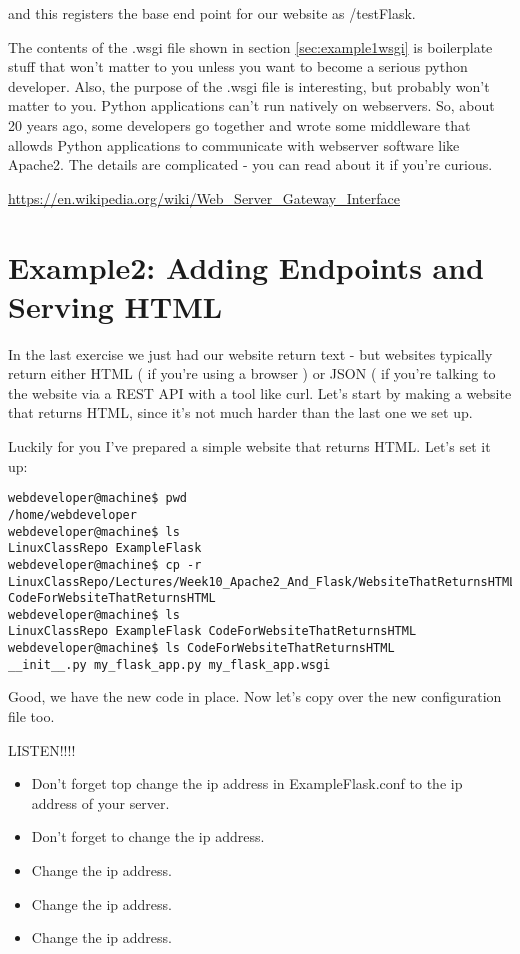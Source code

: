 \documentclass[10pt]{article}
\begin{document}
and this registers the base end point for our website as /testFlask.

The contents of the .wsgi file shown in section \ref{sec:example1wsgi} is boilerplate stuff that won't matter to you unless you want to become a serious python developer. Also, the purpose of the .wsgi file is interesting, but probably won't matter to you. Python applications can't run natively on webservers. So, about 20 years ago, some developers go together and wrote some middleware that allowds Python applications to communicate with webserver software like Apache2. The details are complicated - you can read about it if you're curious. 

\url{https://en.wikipedia.org/wiki/Web_Server_Gateway_Interface}


\section{Example2: Adding Endpoints and Serving HTML}
In the last exercise we just had our website return text - but websites
typically return either HTML ( if you're using a browser ) or JSON ( if you're
talking to the website via a REST API with a tool like curl. Let's start by
making a website that returns HTML, since it's not much harder than the last one
we set up.

Luckily for you I've prepared a simple website that returns HTML. Let's set it
up:

\begin{lstlisting}[style=term, caption=Deploying our second website]
webdeveloper@machine$ pwd
/home/webdeveloper
webdeveloper@machine$ ls
LinuxClassRepo ExampleFlask
webdeveloper@machine$ cp -r
LinuxClassRepo/Lectures/Week10_Apache2_And_Flask/WebsiteThatReturnsHTML/CodeForWebsiteThatReturnsHTML
CodeForWebsiteThatReturnsHTML
webdeveloper@machine$ ls
LinuxClassRepo ExampleFlask CodeForWebsiteThatReturnsHTML
webdeveloper@machine$ ls CodeForWebsiteThatReturnsHTML
__init__.py my_flask_app.py my_flask_app.wsgi
\end{lstlisting}

Good, we have the new code in place. Now let's copy over the new configuration
file too.

\pagebreak

{\LARGE LISTEN!!!!}

\begin{itemize}
\item Don't forget top change the ip address in ExampleFlask.conf to the ip
address of your server.
\item Don't forget to change the ip address.
\item Change the ip address.
\item Change the ip address.
\item Change the ip address.
\end{itemize}
\end{document}
